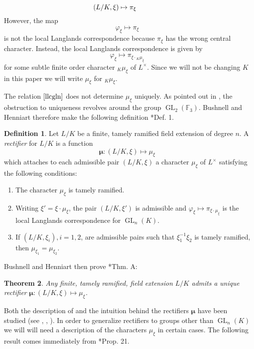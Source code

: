 \documentclass{mrlart7}
\theoremstyle{plain}
\newtheorem{theorem}{Theorem}[section]
\theoremstyle{definition}
\newtheorem{definition}[theorem]{Definition}
\numberwithin{equation}{section}
\DeclareMathOperator{\GL}{GL}
\newcommand{\Lx}{L^\times}
\newcommand{\bmu}{\boldsymbol\mu}
\begin{document}
$$\hspace{-.5in} (L/K, \xi) \mapsto \pi_{\xi}$$
However, the map $$\varphi_{\xi} \mapsto \pi_{\xi}$$
is not the local Langlands
correspondence because $\pi_{\xi}$ has the wrong central character.
Instead, the local Langlands correspondence is given by
\begin{equation}\label{llcgln}
\varphi_{\xi} \mapsto \pi_{\xi \cdot {}_K \mu_{\xi}} \tag{$\star$}
\end{equation}
for some subtle finite order
character ${}_K \mu_{\xi}$ of $\Lx$.  Since we will not be changing $K$
in this paper we will write $\mu_\xi$ for ${}_K \mu_{\xi}$.

The relation $\eqref{llcgln}$ does not determine $\mu_{\xi}$ uniquely.  As pointed out
in \cite{bushnell-henniart:10a}, the obstruction to uniqueness revolves around the
group $\GL_2(\mathbb{F}_3)$.  Bushnell and Henniart therefore make the following definition \cite{bushnell-henniart:10a}*{Def. 1}.

\begin{definition}\label{rectifierbushnellhenniart}
Let $L/K$ be a finite, tamely ramified field extension of degree $n$.  A \emph{rectifier}
for $L/K$ is a function
$$\bmu : (L/K, \xi) \mapsto \mu_{\xi}$$
which attaches to each admissible pair $(L/K, \xi)$ a character $\mu_{\xi}$ of $L^{\times}$
satisfying the following conditions:
\begin{enumerate}
\item The character $\mu_{\xi}$ is tamely ramified.
\item Writing $\xi' = \xi \cdot \mu_{\xi}$, the pair $(L/K, \xi')$ is admissible and
$\varphi_{\xi} \mapsto \pi_{\xi \cdot \mu_{\xi}}$ is the local Langlands correspondence
for $\GL_n(K)$.
\item If $(L/K, \xi_i), i = 1,2$, are admissible pairs such that $\xi_1^{-1} \xi_2$ is
tamely ramified, then $ \mu_{\xi_1} =  \mu_{\xi_2}$.
\end{enumerate}
\end{definition}

Bushnell and Henniart then prove \cite{bushnell-henniart:10a}*{Thm. A}:

\begin{theorem}
Any finite, tamely ramified, field extension $L/K$ admits a unique rectifier
$\bmu : (L/K, \xi) \mapsto \mu_{\xi}$.
\end{theorem}

Both the description of and the
intuition behind the rectifiers $\bmu$ have been
studied (see \cite{bushnell-henniart:10a}, \cite{tam:12a}, \cite{adrian:13a}).  In order to
generalize rectifiers to groups other than $\GL_n(K)$ we
will will need a description of the characters $\mu_{\xi}$ in certain cases.  The following result comes immediately from \cite{bushnell-henniart:10a}*{Prop. 21}.
\end{document}
